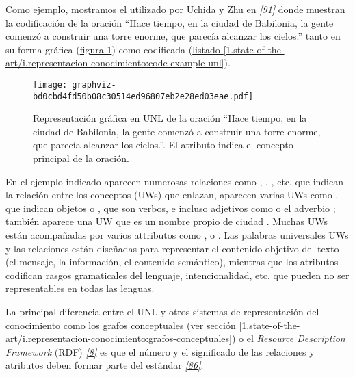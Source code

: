\documentclass[a4paper,12pt,spanish]{book}
\begin{document}
Como ejemplo, mostramos el utilizado por Uchida y Zhu en \label{1.state-of-the-art/i.representacion-conocimiento:id45}{\hyperref[zreferences:uchida2001]{\emph{{[}91{]}}}} donde muestran
la codificación de la oración ``Hace tiempo, en la ciudad de Babilonia, la gente comenzó a
construir una torre enorme, que parecía alcanzar los cielos.'' tanto en su forma
gráfica (\hyperref[1.state-of-the-art/i.representacion-conocimiento:fig-example-unl]{figura  \ref*{1.state-of-the-art/i.representacion-conocimiento:fig-example-unl}}) como codificada (\hyperref[1.state-of-the-art/i.representacion-conocimiento:code-example-unl]{listado  \ref*{1.state-of-the-art/i.representacion-conocimiento:code-example-unl}}).
\begin{figure}[htbp]
\centering
\capstart

\texttt{[image: graphviz-bd0cbd4fd50b08c30514ed96807eb2e28ed03eae.pdf]}
\caption[Ejemplo de representación gráfica de una oración codificada en UNL.]{Representación gráfica en UNL de la oración ``Hace tiempo, en la ciudad de Babilonia, la gente comenzó a construir una torre enorme, que parecía alcanzar los cielos.''. El atributo  indica el concepto principal de la oración.}\label{1.state-of-the-art/i.representacion-conocimiento:fig-example-unl}\end{figure}

En el ejemplo indicado aparecen numerosas relaciones como , , , etc.
que indican la relación entre los conceptos (UWs) que enlazan, aparecen varias UWs como
,  que indican objetos o ,
 que son verbos, e incluso adjetivos como  o el adverbio
; también aparece una UW que es un nombre propio de ciudad
. Muchas UWs están acompañadas por varios attributos como ,
 o .
Las palabras universales UWs y las relaciones están diseñadas para representar el contenido
objetivo del texto (el mensaje, la información, el contenido semántico), mientras que los
atributos codifican rasgos gramaticales del lenguaje, intencionalidad, etc. que pueden
no ser representables en todas las lenguas.

La principal diferencia entre el UNL y otros sistemas de representación del conocimiento como
los grafos conceptuales (ver \hyperref[1.state-of-the-art/i.representacion-conocimiento:grafos-conceptuales]{sección  \ref*{1.state-of-the-art/i.representacion-conocimiento:grafos-conceptuales}}) o el \emph{Resource Description
Framework} (RDF) \label{1.state-of-the-art/i.representacion-conocimiento:id46}{\hyperref[zreferences:brickley2014]{\emph{{[}8{]}}}} es que el número y el significado de las relaciones y
atributos deben formar parte del estándar \label{1.state-of-the-art/i.representacion-conocimiento:id47}{\hyperref[zreferences:teixeiramartins2005]{\emph{{[}86{]}}}}.
\end{document}
